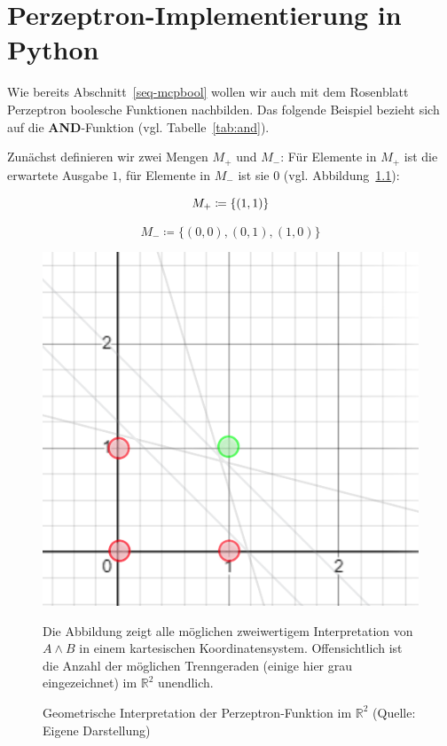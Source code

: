 \chapter{Perzeptron-Implementierung in Python}\label{appendix:pythonperzeptron}

Wie bereits Abschnitt~\ref{seq-mcpbool} wollen wir auch mit dem Rosenblatt Perzeptron boolesche Funktionen nachbilden.
Das folgende Beispiel bezieht sich auf die \textbf{AND}-Funktion (vgl. Tabelle~\ref{tab:and}).

Zunächst definieren wir zwei Mengen $M_+$ und $M_-$: Für Elemente in $M_+$ ist die erwartete Ausgabe $1$, für Elemente in $M_-$ ist sie $0$ (vgl. Abbildung~\ref{fig-rpand}):

\begin{equation}
    M_+ \coloneqq \{(1, 1)\}\\
\end{equation}

\begin{equation}
    M_- \coloneqq \{(0, 0), (0,1), (1,0)\}
\end{equation}

\begin{figure}[h]
    \begin{center}
    \includegraphics{chapters/Anhang/images/perceptron-and}
    \caption{Geometrische Interpretation der Perzeptron-Funktion im $\mathbb{R}^2$ (Quelle: Eigene Darstellung)}
    \end{center}
    \label{fig-rpand}
    \small {
    Die Abbildung zeigt alle möglichen zweiwertigem Interpretation von $A \land B$ in einem kartesischen Koordinatensystem.
    Offensichtlich ist die Anzahl der möglichen Trenngeraden (einige hier grau eingezeichnet) im $\mathbb{R}^2$ unendlich.
    }
\end{figure}

